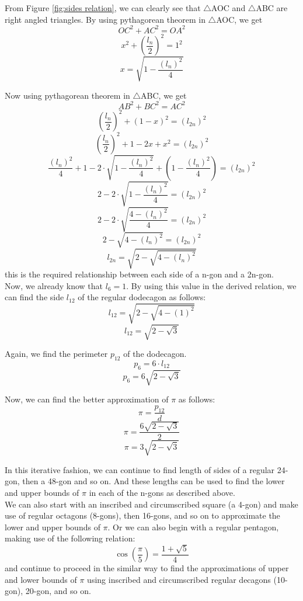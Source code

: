 \documentclass[12pt]{article}
\begin{document}

From Figure \ref{fig:sides relation}, we can clearly see that $\bigtriangleup$AOC and $\bigtriangleup$ABC are right angled triangles. By using pythagorean theorem in $\bigtriangleup$AOC, we get
$$OC^{2}+AC^{2}=OA^{2}$$
$$x^{2}+(\frac{l_{n}}{2})^{2} = 1^{2}$$
$$x = \sqrt{1-\frac{(l_{n})^{2}}{4}}$$

Now using pythagorean theorem in $\bigtriangleup$ABC, we get\\
$$AB^{2}+BC^{2}=AC^{2}$$
$$(\frac{l_{n}}{2})^{2}+(1-x)^{2} = (l_{2n})^{2}$$
$$(\frac{l_{n}}{2})^{2} + 1-2x+x^{2} = (l_{2n})^{2}$$
$$\frac{(l_{n})^{2}}{4}+1-2\cdot\sqrt{1-\frac{(l_{n})^{2}}{4}}+(1-\frac{(l_{n})^{2}}{4})=(l_{2n})^{2}$$
$$2-2\cdot\sqrt{1-\frac{(l_{n})^{2}}{4}}=(l_{2n})^{2}$$
$$2-2\cdot\sqrt{\frac{4-(l_{n})^{2}}{4}}=(l_{2n})^{2}$$
$$2-\sqrt{4-(l_{n})^{2}}=(l_{2n})^{2}$$
$$l_{2n}=\sqrt{2-\sqrt{4-(l_{n})^{2}}}$$
this is the required relationship between each side of a n-gon and a 2n-gon.\\


Now, we already know that $l_{6}=1$. By using this value in the derived relation, we can find the side $l_{12}$ of the regular dodecagon as follows:\\
$$l_{12} = \sqrt{2-\sqrt{4-(1)^{2}}}$$
$$l_{12} = \sqrt{2-\sqrt{3}}$$

Again, we find the perimeter $p_{12}$ of the dodecagon.
$$p_{6}=6\cdot l_{12}$$
$$p_{6}=6\sqrt{2-\sqrt{3}}$$

Now, we can find the better approximation of $\pi$ as follows:
$$\pi = \frac{p_{12}}{d}$$
$$\pi = \frac{6\sqrt{2-\sqrt{3}}}{2}$$
$$\pi = 3\sqrt{2-\sqrt{3}}$$

In this iterative fashion, we can continue to find length of sides of a regular 24-gon, then a 48-gon and so on. And these lengths can be used to find the lower and upper bounds of $\pi$ in each of the n-gons as described above.\\

We can also start with an inscribed and circumscribed square (a 4-gon) and make use of regular octagons (8-gons), then 16-gons, and so on to approximate the lower and upper bounds of $\pi$. Or we can also begin with a regular pentagon, making use of the following relation:
$$\cos(\frac{\pi}{5})=\frac{1+\sqrt{5}}{4}$$
and continue to proceed in the similar way to find the approximations of upper and lower bounds of $\pi$ using inscribed and circumscribed regular decagons (10-gon), 20-gon, and so on.\\
\end{document}
